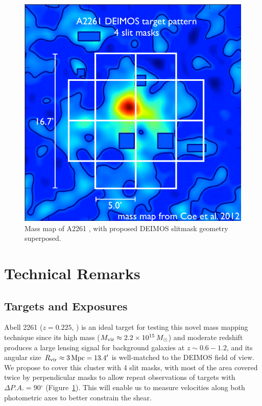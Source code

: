 \documentclass[12pt]{article}
\newcommand{\degr}{\ensuremath{^\circ}}
\begin{document}
\begin{figure}[t]
\begin{center}
\includegraphics[width=0.45\linewidth]{Plots/a2261_deimos_mask.pdf}
\caption{\footnotesize Mass map of A2261 , with proposed DEIMOS slitmask geometry superposed.}
\label{fig:maskoverlay}
\end{center}
\end{figure}



\section{Technical Remarks}

\subsection{Targets and Exposures}

Abell 2261 ($z=0.225$, \citealt{Coe2012}) is an ideal target for testing this novel mass mapping technique since its high mass ($M_{\rm vir}\approx 2.2 \times 10^{15}\,M_{\odot}$) and moderate redshift produces a large lensing signal for background galaxies at $z\sim0.6-1.2$, and its angular size $R_{\rm vir} \approx 3\,{\rm Mpc} = 13.4'$ is well-matched to the DEIMOS field of view. We propose to cover this cluster with 4 slit masks, with most of the area covered twice by perpendicular masks to allow repeat observations of targets with $\Delta P.A.=90\degr$ (Figure~\ref{fig:maskoverlay}). This will enable us to measure velocities along both photometric axes to better constrain the shear.
\end{document}

